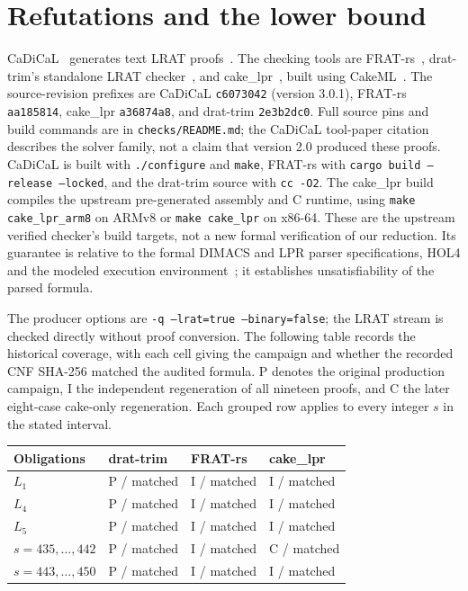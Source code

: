 \documentclass[11pt]{article}
\begin{document}
\section{Refutations and the lower bound}\label{certificates}
CaDiCaL~\cite{cadical} generates text LRAT proofs~\cite{lrat}. The checking tools are FRAT-rs~\cite{frat}, drat-trim's standalone LRAT checker~\cite{drat}, and cake\_lpr~\cite{cake}, built using CakeML~\cite{cakeml}. The source-revision prefixes are CaDiCaL \texttt{c6073042} (version 3.0.1), FRAT-rs \texttt{aa185814}, cake\_lpr \texttt{a36874a8}, and drat-trim \texttt{2e3b2dc0}. Full source pins and build commands are in \texttt{checks/README.md}; the CaDiCaL tool-paper citation describes the solver family, not a claim that version 2.0 produced these proofs. CaDiCaL is built with \texttt{./configure} and \texttt{make}, FRAT-rs with \texttt{cargo build --release --locked}, and the drat-trim source with \texttt{cc -O2}. The cake\_lpr build compiles the upstream pre-generated assembly and C runtime, using \texttt{make cake\_lpr\_arm8} on ARMv8 or \texttt{make cake\_lpr} on x86-64. These are the upstream verified checker's build targets, not a new formal verification of our reduction. Its guarantee is relative to the formal DIMACS and LPR parser specifications, HOL4 and the modeled execution environment~\cite{cake}; it establishes unsatisfiability of the parsed formula.

The producer options are \texttt{-q --lrat=true --binary=false}; the LRAT stream is checked directly without proof conversion. The following table records the historical coverage, with each cell giving the campaign and whether the recorded CNF SHA-256 matched the audited formula. P denotes the original production campaign, I the independent regeneration of all nineteen proofs, and C the later eight-case cake-only regeneration. Each grouped row applies to every integer $s$ in the stated interval.

\begin{center}
\begin{tabular}{llll}\toprule
Obligations & drat-trim & FRAT-rs & cake\_lpr\\\midrule
$L_1$ & P / matched & I / matched & I / matched\\
$L_4$ & P / matched & I / matched & I / matched\\
$L_5$ & P / matched & I / matched & I / matched\\
$s=435,\ldots,442$ & P / matched & I / matched & C / matched\\
$s=443,\ldots,450$ & P / matched & I / matched & I / matched\\\bottomrule
\end{tabular}
\end{center}
\end{document}
